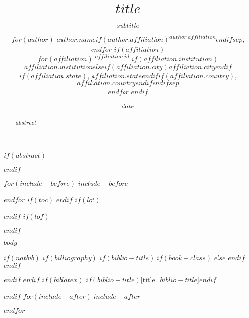 \documentclass[$if(fontsize)$$fontsize$,$endif$$if(lang)$$lang$,$endif$$if(papersize)$$papersize$,$endif$$for(classoption)$$classoption$$sep$,$endfor$]{$documentclass$}
\title{$title$}
\title{}
\subtitle{$subtitle$}
\author{
    $for(author)$
      $author.name$$if(author.affiliation)$\textsuperscript{$author.affiliation$}$endif$$sep$,
    $endfor$
    $if(affiliation)$
      \\ \vspace{0.5cm}
      $for(affiliation)$
        \textsuperscript{$affiliation.id$} $if(affiliation.institution)$$affiliation.institution$$else$$if(affiliation.city)$$affiliation.city$$endif$$if(affiliation.state)$, $affiliation.state$$endif$$if(affiliation.country)$, $affiliation.country$$endif$$endif$$sep$\\
      $endfor$
    $endif$
  }
\author{}
\date{$date$}
\date{}
\newcounter{question}
\begin{document}
\maketitle
\vspace{2pc}
$if(abstract)$
\begin{abstract}
$abstract$
\end{abstract}
$endif$

$for(include-before)$
$include-before$

$endfor$
$if(toc)$
{
  \hypersetup{linkcolor=$if(toccolor)$$toccolor$$else$black$endif$}
  \setcounter{tocdepth}{$toc-depth$}
  \tableofcontents
}
$endif$
$if(lot)$
\listoftables
$endif$
$if(lof)$
\listoffigures
$endif$

\newcommand\Question[2]{%
   \leavevmode\par
   \stepcounter{question}
   \noindent
   \textbf{\thequestion. #1}. #2\par}

\newcommand\Answer[1]{%
    \noindent
    \textit{Registered response}: #1\par}
    
$body$

$if(natbib)$
$if(bibliography)$
$if(biblio-title)$
$if(book-class)$
\renewcommand\bibname{$biblio-title$}
$else$
\renewcommand\refname{$biblio-title$}
$endif$
$endif$


$endif$
$endif$
$if(biblatex)$
\printbibliography$if(biblio-title)$[title=$biblio-title$]$endif$

$endif$
$for(include-after)$
$include-after$

$endfor$
\end{document}

